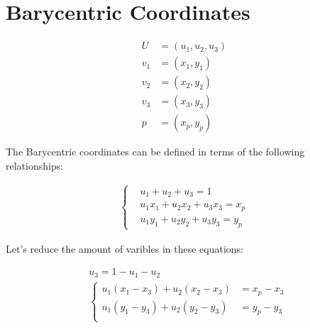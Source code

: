 \documentclass{article}
\begin{document}
\section{Barycentric Coordinates}

\def\xa{0} \def\ya{0}
\def\xb{1} \def\yb{2}
\def\xc{3} \def\yc{-1}
\def\xp{1} \def\yp{0.25}
\begin{center}
\end{center}

\begin{align}
  U &= (u_1, u_2, u_3) \\
  v_1 &= (x_1, y_1) \\
  v_2 &= (x_2, y_2) \\
  v_3 &= (x_3, y_3) \\
  p   &= (x_p, y_p)
\end{align}

The Barycentric coordinates can be defined in terms of the following relationships:

\begin{align}
  \begin{cases}
  & u_1 + u_2 + u_3 = 1 \\
  & u_1x_1 + u_2x_2 + u_3x_3 = x_p \\
  & u_1y_1 + u_2y_2 + u_3y_3 = y_p
  \end{cases}
\end{align}


Let's reduce the amount of varibles in these equations:

\begin{align}
  & u_3 = 1 - u_1 - u_2 \\
  & \begin{cases}
    u_1(x_1 - x_3) + u_2(x_2 - x_3) &= x_p - x_3 \\
    u_1(y_1 - y_3) + u_2(y_2 - y_3) &= y_p - y_3 \\
  \end{cases}
\end{align}
\end{document}
